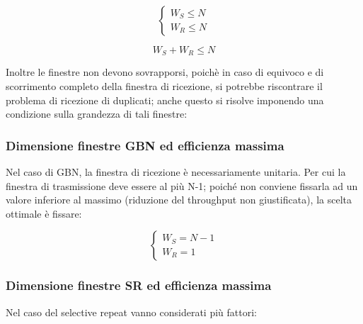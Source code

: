 \begin{center}
\begin{minipage}{0.45\textwidth}
    \begin{equation*}
        \begin{cases}
            W_S \leq N \\
            W_R \leq N
        \end{cases}
    \end{equation*}
\end{minipage}
\hfill
\begin{minipage}{0.45\textwidth}
    \begin{equation*}
        W_S + W_R \leq N
    \end{equation*}
\end{minipage}
\end{center}
Inoltre le finestre non devono sovrapporsi, poichè in caso di equivoco e di scorrimento completo della finestra di ricezione, si potrebbe riscontrare il problema di ricezione di duplicati; anche questo si risolve imponendo una condizione sulla grandezza di tali finestre:

\subsubsection{Dimensione finestre GBN ed efficienza massima}

\begin{minipage}{0.55\textwidth}
Nel caso di GBN, la finestra di ricezione è necessariamente
unitaria. Per cui la finestra di trasmissione deve essere al più
N-1; poiché non conviene fissarla ad un valore inferiore al
massimo (riduzione del throughput non giustificata), la scelta
ottimale è fissare: 
\end{minipage}%
\hfill
\begin{minipage}{0.4\textwidth}
\begin{equation*}
    \begin{cases}
        W_S = N-1 \\
        W_R = 1
    \end{cases}
\end{equation*}
\end{minipage}

\subsubsection{Dimensione finestre SR ed efficienza massima}
Nel caso del selective repeat vanno considerati più fattori:

